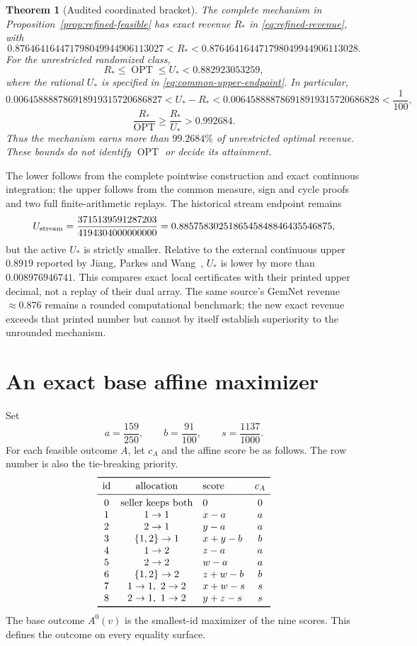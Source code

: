 \documentclass[11pt]{article}
\newtheorem{theorem}{Theorem}
\newcommand{\OPT}{\operatorname{OPT}}
\newcommand{\Ustream}{U_{\rm stream}}
\newcommand{\UpperBound}{\frac{3715139591287203}{4194304000000000}}
\newcommand{\UpperDecimal}{0.8857583025186545848846435546875}
\begin{document}
\begin{theorem}[Audited coordinated bracket]\label{thm:bracket}
The complete mechanism in Proposition~\ref{prop:refined-feasible} has exact
revenue $R_*$ in \eqref{eq:refined-revenue}, with
\[
 0.876464164471798049944906113027<R_*<
 0.876464164471798049944906113028.
\]
For the unrestricted randomized class,
\[
 R_*\le\OPT\le U_*<0.882923053259,
\]
where the rational $U_*$ is specified in \eqref{eq:common-upper-endpoint}.
In particular,
\[
 0.006458888786918919315720686827<U_*-R_*<
 0.006458888786918919315720686828<\frac1{100},
\]
\[
 \frac{R_*}{\OPT}\ge\frac{R_*}{U_*}>0.992684.
\]
Thus the mechanism earns more than $99.2684\%$ of unrestricted optimal
revenue. These bounds do not identify $\OPT$ or decide its attainment.
\end{theorem}

The lower follows from the complete pointwise construction and exact
continuous integration; the upper follows from the common measure, sign
and cycle proofs and two full finite-arithmetic replays. The historical
stream endpoint remains
\[
 \Ustream=\UpperBound=\UpperDecimal,
\]
but the active $U_*$ is strictly smaller. Relative to the external continuous
upper $0.8919$ reported by Jiang, Parkes and Wang~\citep{jiang2026duality},
$U_*$ is lower by more than $0.008976946741$. This compares exact local
certificates with their printed upper decimal, not a replay of their dual
array. The same source's GemNet revenue $\approx0.876$ remains a rounded
computational benchmark; the new exact revenue exceeds that printed number
but cannot by itself establish superiority to the unrounded mechanism.

\section{An exact base affine maximizer}\label{sec:base}

Set
\[
a=\frac{159}{250},\qquad b=\frac{91}{100},\qquad
s=\frac{1137}{1000}.
\]
For each feasible outcome \(A\), let \(c_A\) and the affine score be as follows.
The row number is also the tie-breaking priority.
\[
\begin{array}{cclc}
\toprule
\text{id}&\text{allocation}&\text{score}&c_A\\
\midrule
0&\text{seller keeps both}&0&0\\
1&1\to1&x-a&a\\
2&2\to1&y-a&a\\
3&\{1,2\}\to1&x+y-b&b\\
4&1\to2&z-a&a\\
5&2\to2&w-a&a\\
6&\{1,2\}\to2&z+w-b&b\\
7&1\to1,\ 2\to2&x+w-s&s\\
8&2\to1,\ 1\to2&y+z-s&s\\
\bottomrule
\end{array}
\]
The base outcome \(A^0(v)\) is the smallest-id maximizer of the nine scores.
This defines the outcome on every equality surface.
\end{document}
